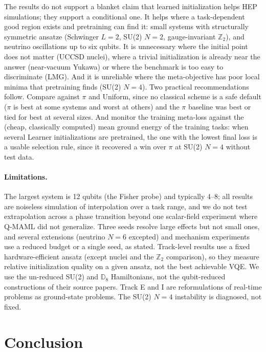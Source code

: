 The results do not support a blanket claim that learned initialization helps HEP simulations; they support a conditional one. It helps where a task-dependent good region exists and pretraining can find it: small systems with structurally symmetric ansatze (Schwinger $L{=}2$, SU(2) $N{=}2$, gauge-invariant $\mathbb{Z}_2$), and neutrino oscillations up to six qubits. It is unnecessary where the initial point does not matter (UCCSD nuclei), where a trivial initialization is already near the answer (near-vacuum Yukawa) or where the benchmark is too easy to discriminate (LMG). And it is unreliable where the meta-objective has poor local minima that pretraining finds (SU(2) $N{=}4$). Two practical recommendations follow. Compare against $\pi$ and Uniform, since no classical scheme is a safe default ($\pi$ is best at some systems and worst at others) and the $\pi$ baseline was best or tied for best at several sizes. And monitor the training meta-loss against the (cheap, classically computed) mean ground energy of the training tasks: when several Learner initializations are pretrained, the one with the lowest final loss is a usable selection rule, since it recovered a win over $\pi$ at SU(2) $N{=}4$ without test data.

\paragraph{Limitations.} The largest system is 12 qubits (the Fisher probe) and typically 4--8; all results are noiseless simulation of interpolation over a task range, and we do not test extrapolation across a phase transition beyond one scalar-field experiment where Q-MAML did not generalize. Three seeds resolve large effects but not small ones, and several extensions (neutrino $N{=}6$ excepted) and mechanism experiments use a reduced budget or a single seed, as stated. Track-level results use a fixed hardware-efficient ansatz (except nuclei and the $\mathbb{Z}_2$ comparison), so they measure relative initialization quality on a given ansatz, not the best achievable VQE. We use the un-reduced SU(2) and $\mathbb{D}_8$ Hamiltonians, not the qubit-reduced constructions of their source papers. Track E and I are reformulations of real-time problems as ground-state problems. The SU(2) $N{=}4$ instability is diagnosed, not fixed.

\section{Conclusion}\label{sec:conclusion}

